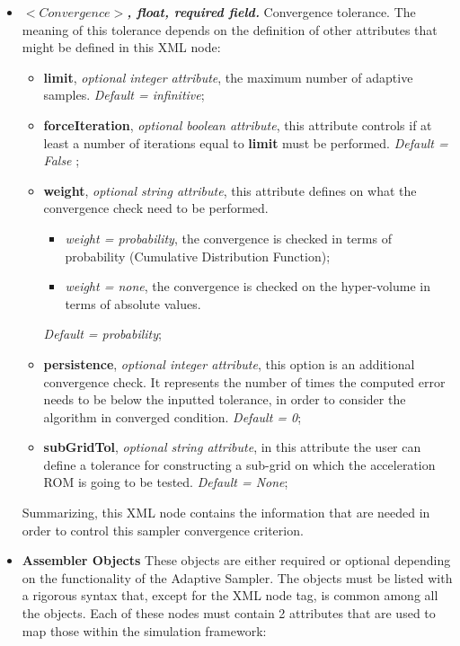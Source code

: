 \begin{itemize}
  \item $<Convergence>$\textbf{\textit{, float, required field.}} Convergence tolerance. The meaning of this tolerance depends on the definition of other attributes that might be defined in this XML node:
     \begin{itemize}
         \item \textbf{limit}, \textit{optional integer attribute}, the maximum number of adaptive samples. \textit{Default = infinitive};
         \item \textbf{forceIteration}, \textit{optional boolean attribute}, this attribute controls if at least a number of iterations equal to \textbf{limit} must be performed.  \textit{Default = False} ;
         \item \textbf{weight}, \textit{optional string attribute}, this attribute defines on what the convergence check need to be performed.
          \begin{itemize}
             \item \textit{weight = probability}, the convergence is checked in terms of probability (Cumulative Distribution Function);
             \item \textit{weight = none}, the convergence is checked on the hyper-volume in terms of absolute values.
          \end{itemize}
          \textit{Default = probability};
         \item \textbf{persistence}, \textit{optional integer attribute}, this option is an additional convergence check. It represents the number of times the computed error needs to be below the inputted tolerance, in order to consider the algorithm in converged condition.  \textit{Default = 0};
         \item \textbf{subGridTol}, \textit{optional string attribute}, in this attribute the user can define a tolerance for constructing a sub-grid on which the acceleration ROM is going to be tested. \textit{Default = None};
      \end{itemize}
   Summarizing,  this XML node contains the information that are needed in order to control this sampler convergence criterion.
   \item \textbf{Assembler Objects} These objects are either required or optional depending on the functionality of the Adaptive Sampler. The objects must be listed with a rigorous syntax that, except for the XML node tag, is common among all the objects.
Each of these nodes  must contain 2 attributes that are used to map those within the simulation framework:

\end{itemize}
